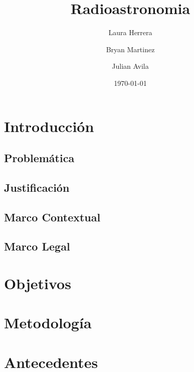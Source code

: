 \documentclass[sn-mathphys]{svmono}
\title{\Huge \textbf{Radioastronomia}}
\author{Laura Herrera \and Bryan Martinez \and Julian Avila}
\date{\today}
\begin{document}
\maketitle

\tableofcontents

\newpage

\chapter{Introducción}
\section{Problemática}


\section{Justificación}


\section{Marco Contextual}


\section{Marco Legal}


\chapter{Objetivos}


\chapter{Metodología}


\chapter{Antecedentes}


\printbibliography
\end{document}

